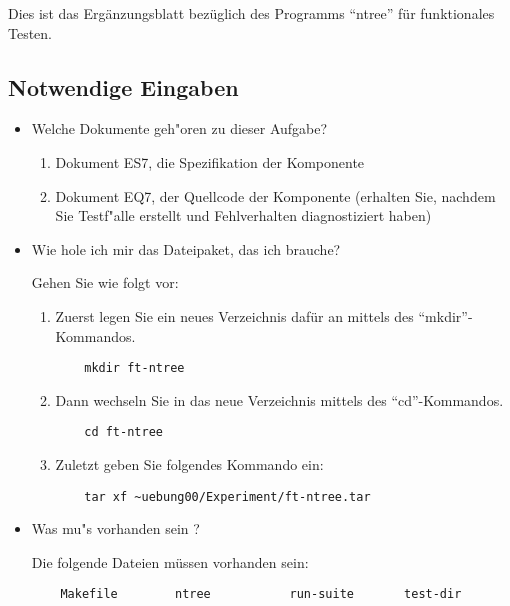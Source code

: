
Dies ist das Erg\"anzungsblatt bez\"uglich des Programms "`ntree"'
f\"ur funktionales Testen.

\subsection*{Notwendige Eingaben}

\begin{itemize}

\item Welche Dokumente geh"oren zu dieser Aufgabe?

\begin{enumerate}
\item Dokument ES7, die Spezifikation der Komponente 
\item Dokument EQ7, der Quellcode der Komponente (erhalten Sie, nachdem
	Sie Testf"alle erstellt und Fehlverhalten diagnostiziert haben)
\end{enumerate}

\item Wie hole ich mir das Dateipaket, das ich brauche?

Gehen Sie wie folgt vor:

\begin{enumerate}

\item Zuerst legen Sie ein neues Verzeichnis daf\"ur an mittels des 
"`mkdir"'-Kommandos.
\begin{verbatim}
    mkdir ft-ntree
\end{verbatim}

\item Dann wechseln Sie in das neue Verzeichnis mittels des 
"`cd"'-Kommandos.
\begin{verbatim}
    cd ft-ntree
\end{verbatim}

\item Zuletzt geben Sie folgendes Kommando ein:
\begin{verbatim}
    tar xf ~uebung00/Experiment/ft-ntree.tar
\end{verbatim}

\end{enumerate}

\item Was mu"s vorhanden sein ?

Die folgende Dateien m\"ussen vorhanden sein:
\begin{verbatim}
    Makefile        ntree           run-suite       test-dir
\end{verbatim}

\end{itemize}

